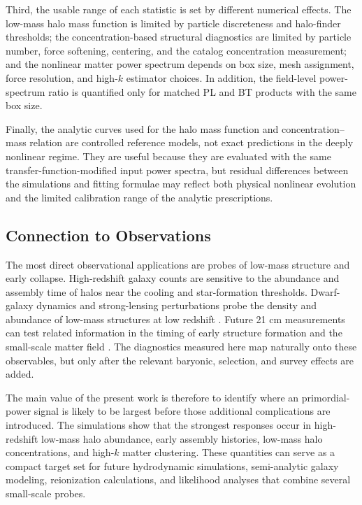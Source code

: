 \documentclass[
 reprint,
 superscriptaddress,
 nofootinbib,
 nobibnotes,
 amsmath,
 amssymb,
 aps,
 prd,
 floatfix,
 longbibliography
]{revtex4-2}
\begin{document}
Third, the usable range of each statistic is set by different numerical effects. The low-mass halo mass function is limited by particle discreteness and halo-finder thresholds; the concentration-based structural diagnostics are limited by particle number, force softening, centering, and the catalog concentration measurement; and the nonlinear matter power spectrum depends on box size, mesh assignment, force resolution, and high-$k$ estimator choices. In addition, the field-level power-spectrum ratio is quantified only for matched PL and BT products with the same box size.

Finally, the analytic curves used for the halo mass function and concentration--mass relation are controlled reference models, not exact predictions in the deeply nonlinear regime. They are useful because they are evaluated with the same transfer-function-modified input power spectra, but residual differences between the simulations and fitting formulae may reflect both physical nonlinear evolution and the limited calibration range of the analytic prescriptions.

\subsection{Connection to Observations}

The most direct observational applications are probes of low-mass structure and early collapse. High-redshift galaxy counts are sensitive to the abundance and assembly time of halos near the cooling and star-formation thresholds. Dwarf-galaxy dynamics and strong-lensing perturbations probe the density and abundance of low-mass structures at low redshift \citep{Dekker25DwarfPPS,Gilman22SubgalacticPPS}. Future 21 cm measurements can test related information in the timing of early structure formation and the small-scale matter field \citep{Munoz20SmallScale21cm,deKruijf25DarkAges,Zhu26SKAPPS}. The diagnostics measured here map naturally onto these observables, but only after the relevant baryonic, selection, and survey effects are added.

The main value of the present work is therefore to identify where an primordial-power signal is likely to be largest before those additional complications are introduced. The simulations show that the strongest responses occur in high-redshift low-mass halo abundance, early assembly histories, low-mass halo concentrations, and high-$k$ matter clustering. These quantities can serve as a compact target set for future hydrodynamic simulations, semi-analytic galaxy modeling, reionization calculations, and likelihood analyses that combine several small-scale probes.
\end{document}
